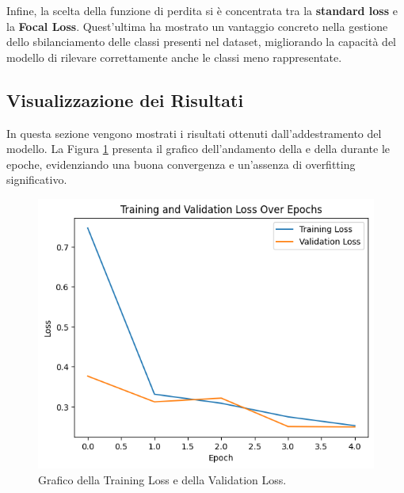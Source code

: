 \documentclass[minted, draw]{../tex/hebdomon}
\begin{document}
Infine, la scelta della funzione di perdita si è concentrata tra la \textbf{standard loss} e la \textbf{Focal Loss}. Quest’ultima ha mostrato un vantaggio concreto nella gestione dello sbilanciamento delle classi presenti nel dataset, migliorando la capacità del modello di rilevare correttamente anche le classi meno rappresentate.



\subsection{Visualizzazione dei Risultati}
In questa sezione vengono mostrati i risultati ottenuti dall’addestramento del modello. La Figura \ref{fig:loss_curve} presenta il grafico dell’andamento della  e della  durante le epoche, evidenziando una buona convergenza e un’assenza di overfitting significativo.

\begin{figure}[H]
  \centering
  \includegraphics[width=.6\linewidth]{figures/loss.png}
  \caption{Grafico della Training Loss e della Validation Loss.}
  \label{fig:loss_curve}
\end{figure}
%
\end{document}
